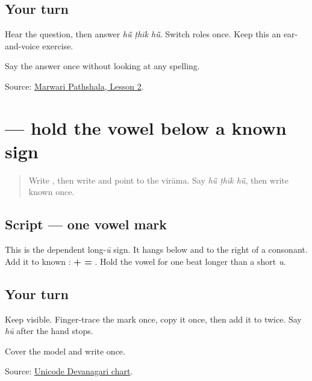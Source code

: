 \subsection*{Your turn}
Hear the question, then answer \emph{hū̃ ṭhīk hū̃}. Switch roles once. Keep this an ear-and-voice exercise.

\begin{tcolorbox}[breakable,colback=teal!4,colframe=teal!35!black,title={Before you move on}]
Say the answer once without looking at any spelling.

Source: \href{https://www.marwaripathshala.com/marwari-lesson-2-english}{Marwari Pathshala, Lesson 2}.
\end{tcolorbox}
\section[\texorpdfstring{\mw{ू} (ū)}{ू (ū)}]{ — hold the vowel below a known sign}

\label{lesson:MW-W06-uu-matra}



\begin{quote}
Write \textbf{}, then write \textbf{} and point to the virāma. Say \emph{hū̃ ṭhīk hū̃}, then write known \textbf{} once.
\end{quote}

\subsection*{Script — one vowel mark}

\begin{quote}
\textbf{}
\end{quote}

This is the dependent long-\emph{ū} sign. It hangs below and to the right of a consonant. Add it to known \textbf{}: \textbf{ +  = }. Hold the vowel for one beat longer than a short \emph{u}.

\subsection*{Your turn}
Keep \textbf{} visible. Finger-trace the mark once, copy it once, then add it to \textbf{} twice. Say \emph{hū} after the hand stops.

\begin{tcolorbox}[breakable,colback=teal!4,colframe=teal!35!black,title={Before you move on}]
Cover the model and write \textbf{} once.

Source: \href{https://www.unicode.org/charts/PDF/U0900.pdf}{Unicode Devanagari chart}.
\end{tcolorbox}
